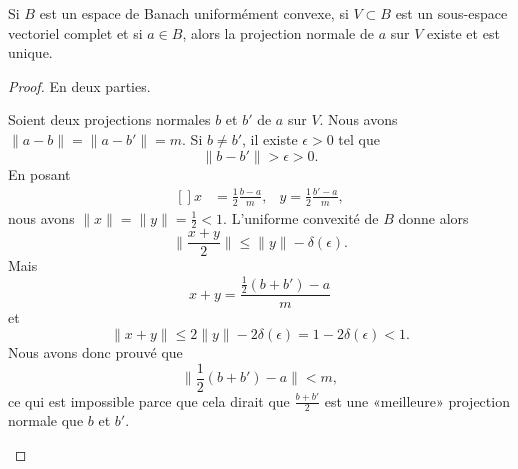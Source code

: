 \begin{theorem}     \label{THOooOOVVooMhzHqd}
    Si \( B\) est un espace de Banach uniformément convexe, si \( V\subset B\) est un sous-espace vectoriel complet et si \( a\in B\), alors la projection normale de \( a\) sur \( V\) existe et est unique.
\end{theorem}

\begin{proof}
    En deux parties.
    \begin{subproof}
        \spitem[Unicité]
        Soient deux projections normales \( b\) et \( b'\) de \( a\) sur \( V\). Nous avons \( \| a-b \|=\| a-b' \|=m\). Si \( b\neq b'\), il existe \( \epsilon>0\) tel que
        \begin{equation}
            \| b-b' \|>\epsilon>0.
        \end{equation}
        En posant
        \begin{equation}
            \begin{aligned}[]
                x & =\frac{ 1 }{2}\frac{ b-a }{ m }, & y=\frac{ 1 }{2}\frac{ b'-a }{ m },
            \end{aligned}
        \end{equation}
        nous avons \( \| x \|=\| y \|=\frac{ 1 }{2}<1\). L'uniforme convexité de \( B\) donne alors
        \begin{equation}
            \| \frac{ x+y }{2} \|\leq \| y \|-\delta(\epsilon).
        \end{equation}
        Mais
        \begin{equation}
            x+y=\frac{ \frac{ 1 }{2}(b+b')-a }{ m }
        \end{equation}
        et
        \begin{equation}
            \| x+y \|\leq 2\| y \|-2\delta(\epsilon)=1-2\delta(\epsilon)<1.
        \end{equation}
        Nous avons donc prouvé que
        \begin{equation}
            \| \frac{ 1 }{2}(b+b')-a \|<m,
        \end{equation}
        ce qui est impossible parce que cela dirait que \( \frac{ b+b' }{2}\) est une «meilleure» projection normale que \( b\) et \( b'\).


\end{subproof}
\end{proof}
